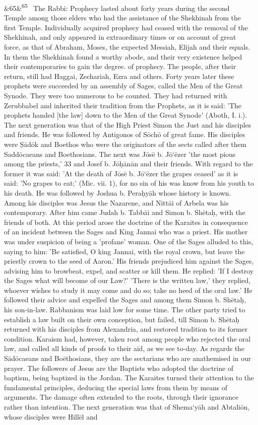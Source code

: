 \documentclass[12pt]{article}
\newcommand{\para}[1][]{\par\noindent\ifx&#1&\else\textsuperscript{\footnotesize #1}~\fi}
\begin{document}
\para[65] The Rabbi: Prophecy lasted about forty years during the second Temple among those elders who had the assistance of the Shekhinah from the first Temple. Individually acquired prophecy had ceased with the removal of the Shekhinah, and only appeared in extraordinary times or on account of great force, as that of Abraham, Moses, the expected Messiah, Elijah and their equals. In them the Shekhinah found a worthy abode, and their very existence helped their contemporaries to gain the degree. of prophecy. The people, after their return, still had Haggai, Zechariah, Ezra and others. Forty years later these prophets were succeeded by an assembly of Sages, called the Men of the Great Synode. They were too numerous to be counted. They had returned with Zerubbabel and inherited their tradition from the Prophets, as it is said: 'The prophets handed [the law] down to the Men of the Great Synode' (Aboth, I. i.). The next generation was that of the High Priest Simon the Just and his disciples and friends. He was followed by Antigonos of Sōchō of great fame. His disciples were Ṣādōk and Boethos who were the originators of the sects called after them Saddōcaeans and Boethosians. The next was Jōsē b. Jō‘ēzer 'the most pious among the priests,' 33 and Josef b. Jōḥānān and their friends. With regard to the former it was said: 'At the death of Jōsē b. Jō‘ēzer the grapes ceased' as it is said: 'No grapes to eat;' (Mic. vii. 1), for no sin of his was know from his youth to his death. He was followed by Joshua b. Peraḥyāh whose history is known. Among his disciples was Jesus the Nazarene, and Nittāi of Arbela was his contemporary. After him came Judah b. Tabbāi and Simon b. Shētaḥ, with the friends of both. At this period arose the doctrine of the Karaites in consequence of an incident between the Sages and King Jannai who was a priest. His mother was under suspicion of being a 'profane' woman. One of the Sages alluded to this, saying to him: 'Be satisfied, O king Jannai, with the royal crown, but leave the priestly crown to the seed of Aaron.' His friends prejudiced him against the Sages, advising him to browbeat, expel, and scatter or kill them. He replied: 'If I destroy the Sages what will become of our Law?' 'There is the written law,' they replied, whoever wishes to study it may come and do so; take no heed of the oral law.' He followed their advice and expelled the Sages and among them Simon b. Shētaḥ, his son-in-law. Rabbanism was laid low for some time. The other party tried to establish a law built on their own conception, but failed, till Simon b. Shētaḥ returned with his disciples from Alexandria, and restored tradition to its former condition. Karaism had, however, taken root among people who rejected the oral law, and called all kinds of proofs to their aid, as we see to-day. As regards the Sādōcaeans and Boēthosians, they are the sectarians who are anathemised in our prayer. The followers of Jesus are the Baptists who adopted the doctrine of baptism, being baptized in the Jordan. The Karaites turned their attention to the fundamental principles, deducing the special laws from them by means of arguments. The damage often extended to the roots, through their ignorance rather than intention. The next generation was that of Shema‘yāh and Abtaliōn, whose disciples were Hillēl and 
\end{document}
